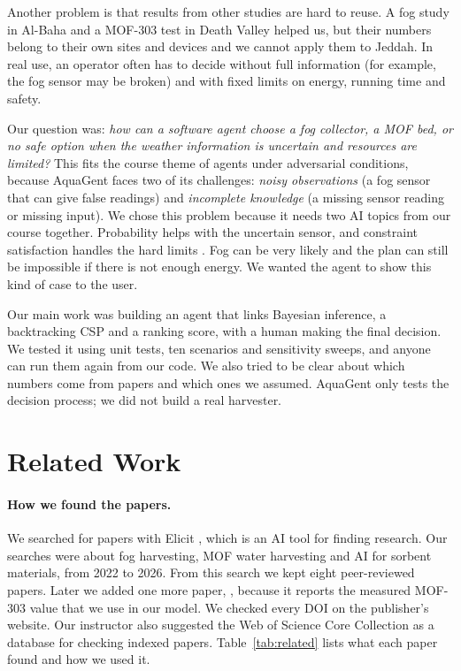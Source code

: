 \documentclass[11pt]{article}
\begin{document}
Another problem is that results from other studies are hard to reuse. A fog study in Al-Baha \citep{alzahrani2025fog} and a MOF-303 test in Death Valley \citep{song2023mof} helped us, but their numbers belong to their own sites and devices and we cannot apply them to Jeddah. In real use, an operator often has to decide without full information (for example, the fog sensor may be broken) and with fixed limits on energy, running time and safety.

Our question was: \emph{how can a software agent choose a fog collector, a MOF bed, or no safe option when the weather information is uncertain and resources are limited?} This fits the course theme of agents under adversarial conditions, because AquaGent faces two of its challenges: \emph{noisy observations} (a fog sensor that can give false readings) and \emph{incomplete knowledge} (a missing sensor reading or missing input). We chose this problem because it needs two AI topics from our course together. Probability helps with the uncertain sensor, and constraint satisfaction handles the hard limits \citep{russell2021aima}. Fog can be very likely and the plan can still be impossible if there is not enough energy. We wanted the agent to show this kind of case to the user.

Our main work was building an agent that links Bayesian inference, a backtracking CSP and a ranking score, with a human making the final decision. We tested it using unit tests, ten scenarios and sensitivity sweeps, and anyone can run them again from our code. We also tried to be clear about which numbers come from papers and which ones we assumed. AquaGent only tests the decision process; we did not build a real harvester.

\newpage
\section{Related Work}

\paragraph{How we found the papers.} We searched for papers with Elicit \citep{elicit}, which is an AI tool for finding research. Our searches were about fog harvesting, MOF water harvesting and AI for sorbent materials, from 2022 to 2026. From this search we kept eight peer-reviewed papers. Later we added one more paper, \citet{song2023mof}, because it reports the measured MOF-303 value that we use in our model. We checked every DOI on the publisher's website. Our instructor also suggested the Web of Science Core Collection \citep{wos} as a database for checking indexed papers. Table~\ref{tab:related} lists what each paper found and how we used it.
\end{document}
